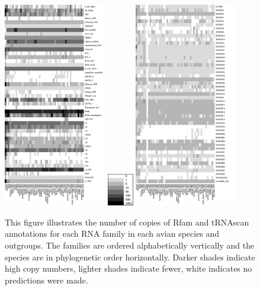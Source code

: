 \documentclass[10pt]{bmc_article}
\newenvironment{bmcformat}{\begin{raggedright}\baselineskip20pt\sloppy\setboolean{publ}{false}}{\end{raggedright}\baselineskip20pt\sloppy}
\begin{document}
\begin{bmcformat}
\begin{figure}[ht]
  \includegraphics[width=0.4\textwidth]{figures/RNA.pdf}
  \includegraphics[width=0.1\textwidth]{figures/key2.pdf}
  \includegraphics[width=0.4\textwidth]{figures/snoRNA-human-yeast-correspondences.pdf}
  \caption[]{This figure illustrates the number of copies of Rfam and
    tRNAscan annotations for each RNA family in each avian species and
    outgroups. The families are ordered alphabetically vertically and
    the species are in phylogenetic order horizontally. Darker shades
    indicate high copy numbers, lighter shades indicate fewer, white
    indicates no predictions were made.}\label{fig:1}
\end{figure}


\end{bmcformat}
\end{document}
